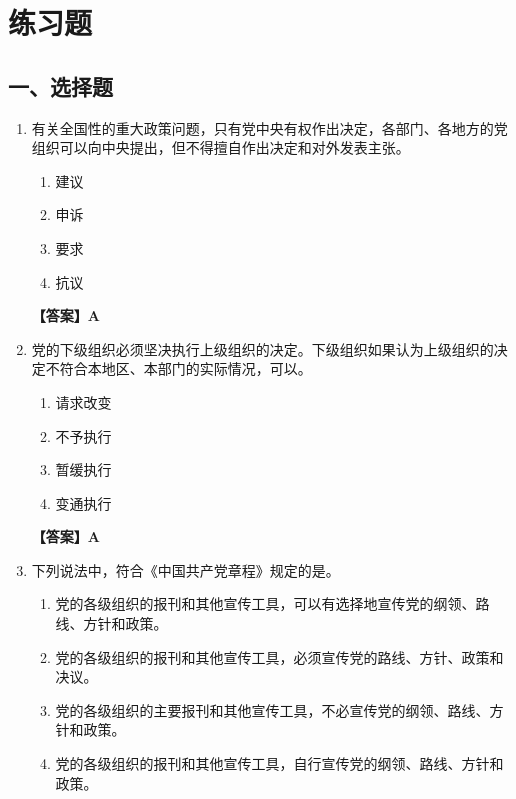 \documentclass[UTF8,11pt,a4paper]{ctexart}
\begin{document}
\section*{练习题}

\subsection*{一、选择题}

\begin{enumerate}[label=\textbf{\arabic*.}, leftmargin=2.5em, itemsep=0.7em]
\item 有关全国性的重大政策问题，只有党中央有权作出决定，各部门、各地方的党组织可以向中央提出\allowbreak\underline{\hspace{4em}}，但不得擅自作出决定和对外发表主张。
\begin{enumerate}[label=\Alph*., leftmargin=2em, itemsep=0.1em, topsep=0.15em]
\item 建议
\item 申诉
\item 要求
\item 抗议
\end{enumerate}
\textbf{【答案】A}
\item 党的下级组织必须坚决执行上级组织的决定。下级组织如果认为上级组织的决定不符合本地区、本部门的实际情况，可以\allowbreak\underline{\hspace{4em}}。
\begin{enumerate}[label=\Alph*., leftmargin=2em, itemsep=0.1em, topsep=0.15em]
\item 请求改变
\item 不予执行
\item 暂缓执行
\item 变通执行
\end{enumerate}
\textbf{【答案】A}
\item 下列说法中，符合《中国共产党章程》规定的是\allowbreak\underline{\hspace{4em}}。
\begin{enumerate}[label=\Alph*., leftmargin=2em, itemsep=0.1em, topsep=0.15em]
\item 党的各级组织的报刊和其他宣传工具，可以有选择地宣传党的纲领、路线、方针和政策。
\item 党的各级组织的报刊和其他宣传工具，必须宣传党的路线、方针、政策和决议。
\item 党的各级组织的主要报刊和其他宣传工具，不必宣传党的纲领、路线、方针和政策。
\item 党的各级组织的报刊和其他宣传工具，自行宣传党的纲领、路线、方针和政策。

\end{enumerate}
\end{enumerate}
\end{document}
